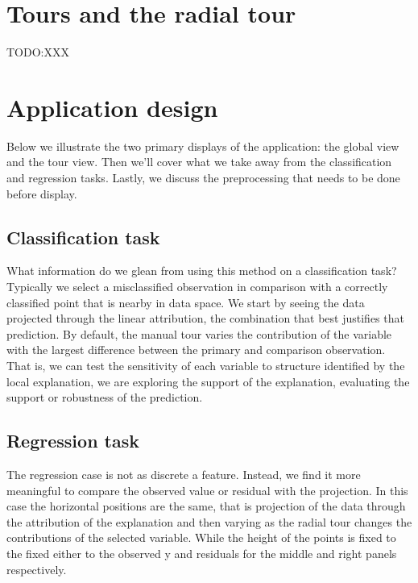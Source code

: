 \documentclass[
]{article}
\begin{document}
\hypertarget{tours-and-the-radial-tour}{%
\section{Tours and the radial tour}\label{tours-and-the-radial-tour}}

TODO:XXX

\hypertarget{sec:applicationdesign}{%
\section{Application design}\label{sec:applicationdesign}}

Below we illustrate the two primary displays of the application: the global view and the tour view. Then we'll cover what we take away from the classification and regression tasks. Lastly, we discuss the preprocessing that needs to be done before display.

\hypertarget{classification-task}{%
\subsection{Classification task}\label{classification-task}}

What information do we glean from using this method on a classification task? Typically we select a misclassified observation in comparison with a correctly classified point that is nearby in data space. We start by seeing the data projected through the linear attribution, the combination that best justifies that prediction. By default, the manual tour varies the contribution of the variable with the largest difference between the primary and comparison observation. That is, we can test the sensitivity of each variable to structure identified by the local explanation, we are exploring the support of the explanation, evaluating the support or robustness of the prediction.

\hypertarget{regression-task}{%
\subsection{Regression task}\label{regression-task}}

The regression case is not as discrete a feature. Instead, we find it more meaningful to compare the observed value or residual with the projection. In this case the horizontal positions are the same, that is projection of the data through the attribution of the explanation and then varying as the radial tour changes the contributions of the selected variable. While the height of the points is fixed to the fixed either to the observed y and residuals for the middle and right panels respectively.
\end{document}
